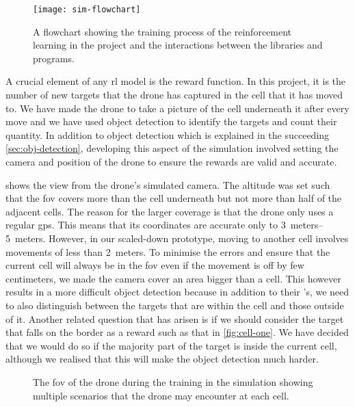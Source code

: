 \documentclass[../main.tex]{subfiles}
\begin{document}
\begin{figure}[p]
    \centering
    \texttt{[image: sim-flowchart]}
    \caption{A flowchart showing the training process
        of the reinforcement learning in the project
        and the interactions between the libraries
        and programs.}
    \label{fig:sim-flowchart}
\end{figure}

A crucial element of any \gls{rl} model
is the reward function. In this project, it
is the number of new targets that the drone has captured
in the cell that it has moved to. We have made the drone
to take a picture of the cell underneath it after 
every move and we have used object detection to
identify the targets and count their quantity. 
In addition to object detection which is explained
in the succeeding \cref{sec:obj-detection}, developing this
aspect of the simulation involved 
setting the camera and position of the drone to ensure
the rewards are valid and accurate.

 shows the view from the drone's
simulated camera. The altitude was set such that
the \gls{fov} covers more than the cell underneath
but not more than half of the adjacent cells.
The reason for the larger coverage is that
the \anafi drone only uses a regular \gls{gps}.
This means that its coordinates are accurate only
to \SIrange{3}{5}{meters}. However, in our scaled-down
prototype, moving to another
cell involves
movements of less than \SI{2}{meters}.
To minimise the errors and ensure that the current
cell will always be in the \gls{fov} even if the
movement is off by few centimeters, we made the camera
cover an area bigger than a cell. 
This however results in a more difficult
object detection because in addition to their 
\id's, we need to also distinguish between
the targets that are within the cell and 
those outside of it.
Another related question that has arisen is if we 
should consider the target that falls on the border 
as a reward such as that in \cref{fig:cell-one}. 
We have decided that we would do so if
the majority part of the target is inside the current
cell, although we realised that this will make the
object detection much harder.

\begin{figure}[tb]%
    \centering
    \hspace{0.2cm}
    \hspace{0.2cm}
    \caption{%
        \protect The \gls{fov} of the \anafi drone
        during the training in the simulation
        showing multiple scenarios that the drone
        may encounter at each cell.}%
    \label{fig:fov}%
\end{figure}
\end{document}
